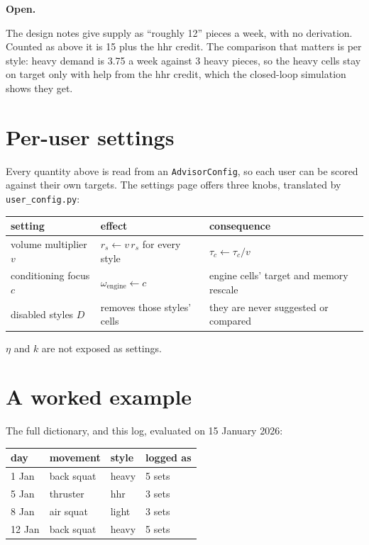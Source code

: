 \documentclass[11pt]{article}
\newenvironment{openitem}{%
  \def\FrameCommand{\fboxsep=8pt{\color{openbar}\vrule width 3pt}\colorbox{openbg}}%
  \MakeFramed{\advance\hsize-\width \FrameRestore}\noindent
  \textbf{Open.}\ %
}{%
  \endMakeFramed\medskip
}
\theoremstyle{plain}
\theoremstyle{definition}
\newcommand{\code}[1]{\texttt{#1}}
\begin{document}
\begin{openitem}
The design notes give supply as ``roughly 12'' pieces a week, with no
derivation. Counted as above it is 15 plus the hhr credit. The comparison
that matters is per style: heavy demand is 3.75 a week against 3 heavy
pieces, so the heavy cells stay on target only with help from the hhr
credit, which the closed-loop simulation shows they get.
\end{openitem}

\section{Per-user settings}\label{sec:config}

Every quantity above is read from an \code{AdvisorConfig}, so each user
can be scored against their own targets. The settings page offers three
knobs, translated by \code{user\_config.py}:

\begin{center}
\begin{tabular}{lll}
\toprule
setting & effect & consequence \\
\midrule
volume multiplier $v$ & $r_s \leftarrow v\, r_s$ for every style
  & $\tau_c \leftarrow \tau_c / v$ \\
conditioning focus $c$ & $\omega_\mathrm{engine} \leftarrow c$
  & engine cells' target and memory rescale \\
disabled styles $D$ & removes those styles' cells
  & they are never suggested or compared \\
\bottomrule
\end{tabular}
\end{center}

$\eta$ and $k$ are not exposed as settings.

\section{A worked example}\label{sec:example}

The full dictionary, and this log, evaluated on 15 January 2026:

\begin{center}
\begin{tabular}{llll}
\toprule
day & movement & style & logged as \\
\midrule
1 Jan  & back squat & heavy & 5 sets \\
5 Jan  & thruster   & hhr   & 3 sets \\
8 Jan  & air squat  & light & 3 sets \\
12 Jan & back squat & heavy & 5 sets \\
\bottomrule
\end{tabular}
\end{center}
\end{document}
